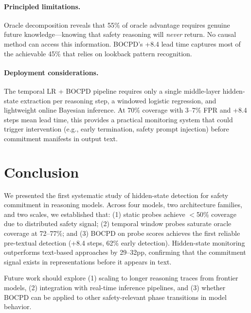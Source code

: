 \documentclass[11pt,a4paper]{article}
\begin{document}
\paragraph{Principled limitations.} Oracle decomposition reveals that 55\% of oracle advantage requires genuine future knowledge---knowing that safety reasoning will \emph{never} return. No causal method can access this information. BOCPD's +8.4 lead time captures most of the achievable 45\% that relies on lookback pattern recognition.

\paragraph{Deployment considerations.} The temporal LR + BOCPD pipeline requires only a single middle-layer hidden-state extraction per reasoning step, a windowed logistic regression, and lightweight online Bayesian inference. At 70\% coverage with 3--7\% FPR and +8.4 steps mean lead time, this provides a practical monitoring system that could trigger intervention (e.g., early termination, safety prompt injection) before commitment manifests in output text.

\section{Conclusion}
\label{sec:conclusion}

We presented the first systematic study of hidden-state detection for safety commitment in reasoning models. Across four models, two architecture families, and two scales, we established that: (1) static probes achieve $<$50\% coverage due to distributed safety signal; (2) temporal window probes saturate oracle coverage at 72--77\%; and (3) BOCPD on probe scores achieves the first reliable pre-textual detection (+8.4 steps, 62\% early detection). Hidden-state monitoring outperforms text-based approaches by 29--32pp, confirming that the commitment signal exists in representations before it appears in text.

Future work should explore (1) scaling to longer reasoning traces from frontier models, (2) integration with real-time inference pipelines, and (3) whether BOCPD can be applied to other safety-relevant phase transitions in model behavior.
\end{document}
